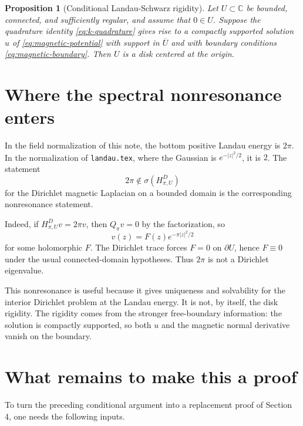 \documentclass[11pt]{article}
\newtheorem{proposition}{Proposition}
\newcommand{\C}{\mathbb C}
\newcommand{\1}{\mathbf 1}
\begin{document}
\begin{proposition}[Conditional Landau-Schwarz rigidity]
Let \(U\subset\C\) be bounded, connected, and sufficiently regular, and assume
that \(0\in U\).  Suppose the quadrature identity
\eqref{eq:k-quadrature} gives rise to a compactly supported solution
\(u\) of \eqref{eq:magnetic-potential} with support in \(\overline U\) and
with boundary conditions \eqref{eq:magnetic-boundary}.  Then \(U\) is a disk
centered at the origin.
\end{proposition}

\section{Where the spectral nonresonance enters}

In the field normalization of this note, the bottom positive Landau energy is
\(2\pi\).  In the normalization of \texttt{landau.tex}, where the Gaussian is
\(e^{-|z|^2/2}\), it is \(2\).  The statement
\[
        2\pi\notin\sigma(H_{\pi,U}^D)
\]
for the Dirichlet magnetic Laplacian on a bounded domain is the corresponding
nonresonance statement.

Indeed, if \(H_{\pi,U}^D v=2\pi v\), then \(Q_\pi v=0\) by the factorization,
so
\[
        v(z)=F(z)e^{-\pi |z|^2/2}
\]
for some holomorphic \(F\).  The Dirichlet trace forces \(F=0\) on
\(\partial U\), hence \(F\equiv 0\) under the usual connected-domain
hypotheses.  Thus \(2\pi\) is not a Dirichlet eigenvalue.

This nonresonance is useful because it gives uniqueness and solvability for
the interior Dirichlet problem at the Landau energy.  It is not, by itself, the
disk rigidity.  The rigidity comes from the stronger free-boundary information:
the solution is compactly supported, so both \(u\) and the magnetic normal
derivative vanish on the boundary.

\section{What remains to make this a proof}

To turn the preceding conditional argument into a replacement proof of
Section 4, one needs the following inputs.
\end{document}

